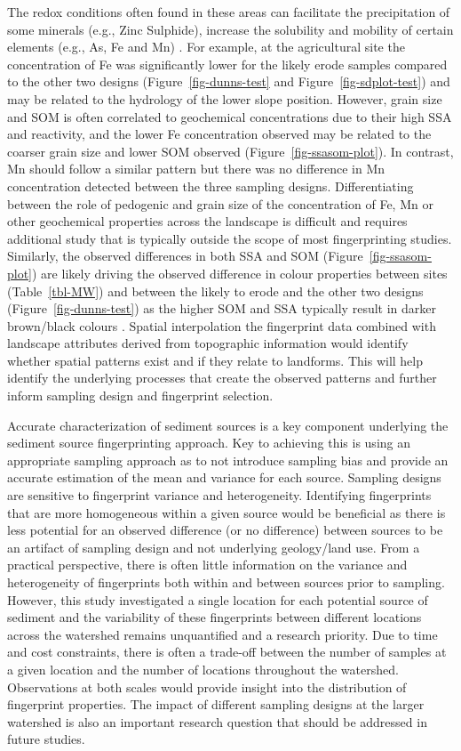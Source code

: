 \documentclass[
  number]{elsarticle}
\begin{document}
The redox conditions often found in these areas can facilitate the
precipitation of some minerals (e.g., Zinc Sulphide), increase the
solubility and mobility of certain elements (e.g., As, Fe and Mn)
\citep{dulaing2010, rinklebe2016}. For example, at the agricultural site
the concentration of Fe was significantly lower for the likely erode
samples compared to the other two designs (Figure~\ref{fig-dunns-test}
and Figure~\ref{fig-sdplot-test}) and may be related to the hydrology of
the lower slope position. However, grain size and SOM is often
correlated to geochemical concentrations due to their high SSA and
reactivity, and the lower Fe concentration observed may be related to
the coarser grain size and lower SOM observed
(Figure~\ref{fig-ssasom-plot}). In contrast, Mn should follow a similar
pattern but there was no difference in Mn concentration detected between
the three sampling designs. Differentiating between the role of
pedogenic and grain size of the concentration of Fe, Mn or other
geochemical properties across the landscape is difficult and requires
additional study that is typically outside the scope of most
fingerprinting studies. Similarly, the observed differences in both SSA
and SOM (Figure~\ref{fig-ssasom-plot}) are likely driving the observed
difference in colour properties between sites (Table~\ref{tbl-MW}) and
between the likely to erode and the other two designs
(Figure~\ref{fig-dunns-test}) as the higher SOM and SSA typically result
in darker brown/black colours \citep{viscarrarossel2006}. Spatial
interpolation the fingerprint data combined with landscape attributes
derived from topographic information would identify whether spatial
patterns exist and if they relate to landforms. This will help identify
the underlying processes that create the observed patterns and further
inform sampling design and fingerprint selection.

Accurate characterization of sediment sources is a key component
underlying the sediment source fingerprinting approach. Key to achieving
this is using an appropriate sampling approach as to not introduce
sampling bias and provide an accurate estimation of the mean and
variance for each source. Sampling designs are sensitive to fingerprint
variance and heterogeneity. Identifying fingerprints that are more
homogeneous within a given source would be beneficial as there is less
potential for an observed difference (or no difference) between sources
to be an artifact of sampling design and not underlying geology/land
use. From a practical perspective, there is often little information on
the variance and heterogeneity of fingerprints both within and between
sources prior to sampling. However, this study investigated a single
location for each potential source of sediment and the variability of
these fingerprints between different locations across the watershed
remains unquantified and a research priority. Due to time and cost
constraints, there is often a trade-off between the number of samples at
a given location and the number of locations throughout the watershed.
Observations at both scales would provide insight into the distribution
of fingerprint properties. The impact of different sampling designs at
the larger watershed is also an important research question that should
be addressed in future studies.
\end{document}
